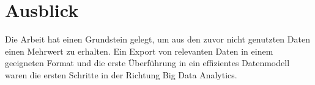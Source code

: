 %
%
%
%
%
%
%
%
%
%

\section{Ausblick}
Die Arbeit hat einen Grundstein gelegt, um aus den zuvor nicht genutzten Daten einen Mehrwert zu erhalten.
Ein Export von relevanten Daten in einem geeigneten Format und die erste Überführung in ein effizientes Datenmodell waren die ersten Schritte in der Richtung \glqq Big Data Analytics\grqq {}.

